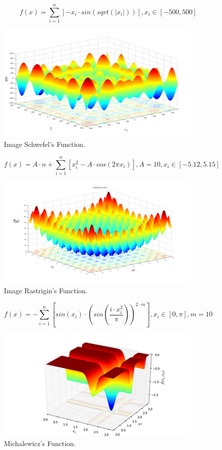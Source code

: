 \documentclass{report}
\begin{document}
\begin{figure}[!h]
  \centering
  $$ f(x) = \sum_{i=1}^n \left[-x_i \cdot sin(sqrt(|x_i|)) \right],
   x_i \in \left[ -500, 500 \right]$$

  \includegraphics[width=100mm,scale=0.5]{Schwefel_fucntion}
  \caption{Image Schwefel's Function. \protect\footnotemark}
\end{figure}

\begin{figure}[!h]
  \centering
  $$ f(x) = A \cdot n + \sum_{i=1}^n \left[ x_i^2 - A \cdot cos(2 \pi x_i) \right],
  A = 10, x_i \in \left[ -5.12, 5.15 \right]$$

  \includegraphics[width=100mm,scale=0.5]{Rastrigin_function}
  \caption{Image Rastrigin's Function. \protect\footnotemark}
\end{figure}

\begin{figure}[!h]
  \centering
  $$ f(x) = -\sum_{i=1}^n \left[sin(x_i) \cdot \left( sin\left( \frac{i \cdot x_i^2}{\pi}  \right) \right)^{2 \cdot m} \right] ,
  x_i \in \left[ 0, \pi \right] ,  m = 10$$

  \includegraphics[width=100mm,scale=0.5]{Michalewicz_functions}
  \caption{Michalewicz's Function. \protect\footnotemark}
\end{figure}
\end{document}

